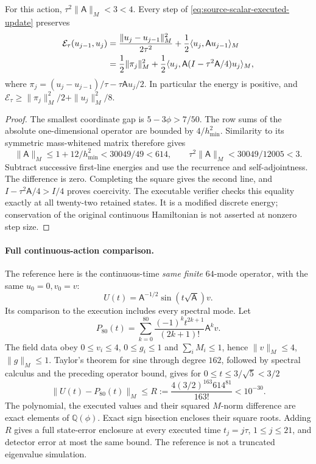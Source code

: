 \begin{proposition}
\label{prop:source-scalar-execution-energy}
For this action, $\tau^2\|\mathsf A\|_M<3<4$.
Every step of \eqref{eq:source-scalar-executed-update} preserves
\begin{align}
 \mathcal E_\tau(u_{j-1},u_j)
 &=\frac{\|u_j-u_{j-1}\|_M^2}{2\tau^2}
       +\frac12\langle u_j,\mathsf A u_{j-1}\rangle_M\notag\\
 &=\frac12\|\pi_j\|_M^2+
 \frac12\langle u_j,\mathsf A(I-\tau^2\mathsf A/4)u_j\rangle_M,
 \label{eq:source-scalar-execution-energy}
\end{align}
where $\pi_j=(u_j-u_{j-1})/\tau-\tau\mathsf A u_j/2$.
In particular the energy is positive, and
$\mathcal E_\tau\ge\|\pi_j\|_M^2/2+\|u_j\|_M^2/8$.
\end{proposition}
\begin{proof}
The smallest coordinate gap is $5-3\phi>7/50$. The row sums of the
absolute one-dimensional operator are bounded by $4/h_{\min}^2$.
Similarity to its symmetric mass-whitened matrix therefore gives
\[
 \|\mathsf A\|_M\le1+12/h_{\min}^2
 <30049/49<614,\qquad
 \tau^2\|\mathsf A\|_M<30049/12005<3.
\]
Subtract successive first-line energies and use the recurrence and
self-adjointness. The difference is zero. Completing the square gives
the second line, and $I-\tau^2\mathsf A/4> I/4$ proves coercivity.
The executable verifier checks this equality exactly at all twenty-two
retained states. It is a modified discrete energy; conservation of the
original continuous Hamiltonian is not asserted at nonzero step size.
\end{proof}

\paragraph{Full continuous-action comparison.}
The reference here is the continuous-time \emph{same finite} $64$-mode
operator, with the same $u_0=0,v_0=v$:
\[
 U(t)=\mathsf A^{-1/2}\sin(t\sqrt{\mathsf A})v.
\]
Its comparison to the execution includes every spectral mode. Let
\[
 P_{80}(t)=\sum_{k=0}^{80}
       \frac{(-1)^kt^{2k+1}}{(2k+1)!}\mathsf A^kv.
\]
The field data obey $0\le v_i\le4$, $0\le g_i\le1$ and
$\sum_iM_i\le1$, hence $\|v\|_M\le4$, $\|g\|_M\le1$.
Taylor's theorem for sine through degree $162$, followed by spectral
calculus and the preceding operator bound, gives for
$0\le t\le3/\sqrt5<3/2$
\begin{equation}
 \|U(t)-P_{80}(t)\|_M
 \le R:=\frac{4(3/2)^{163}614^{81}}{163!}<10^{-30}.
 \label{eq:source-scalar-execution-tail}
\end{equation}
The polynomial, the executed values and their squared $M$-norm difference
are exact elements of $\mathbb Q(\phi)$. Exact sign bisection encloses
their square roots. Adding $R$ gives a full state-error enclosure at every
executed time $t_j=j\tau$, $1\le j\le21$, and detector error at most
the same bound. The reference is not a truncated eigenvalue simulation.

